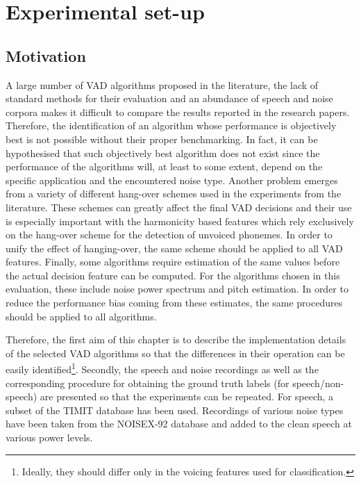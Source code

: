 
\chapter{Experimental set-up} %

\label{Chapter3} %



\section{Motivation}

A large number of VAD algorithms proposed in the literature, the lack of standard methods for their evaluation and an abundance of speech and noise corpora makes it difficult to compare the results reported in the research papers. Therefore, the identification of an algorithm whose performance is objectively best is not possible without their proper benchmarking. In fact, it can be hypothesised that such objectively best algorithm does not exist since the performance of the algorithms will, at least to some extent, depend on the specific application and the encountered noise type. Another problem emerges from a variety of different hang-over schemes used in the experiments from the literature. These schemes can greatly affect the final VAD decisions and their use is especially important with the harmonicity based features which rely exclusively on the hang-over scheme for the detection of unvoiced phonemes. In order to unify the effect of hanging-over, the same scheme should be applied to all VAD features. Finally, some algorithms require estimation of the same values before the actual decision feature can be computed. For the algorithms chosen in this evaluation, these include noise power spectrum and pitch estimation. In order to reduce the performance bias coming from these estimates, the same procedures should be applied to all algorithms.

Therefore, the first aim of this chapter is to describe the implementation details of the selected VAD algorithms so that the differences in their operation can be easily identified\footnote{Ideally, they should differ only in the voicing features used for classification.}. Secondly, the speech and noise recordings as well as the corresponding procedure for obtaining the ground truth labels (for speech/non-speech) are presented so that the experiments can be repeated. For speech, a subset of the TIMIT \cite{TIMIT} database has been used. Recordings of various noise types have been taken from the NOISEX-92 \cite{NOISEX} database and added to the clean speech at various power levels.

